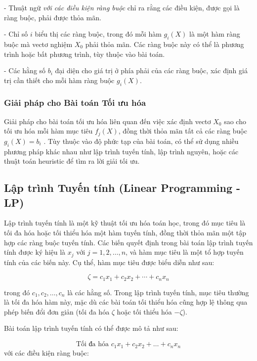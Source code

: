 - Thuật ngữ \textit{với các điều kiện ràng buộc} chỉ ra rằng các điều kiện, được gọi là ràng buộc, phải được thỏa mãn.

- Chỉ số \( i \) biểu thị các ràng buộc, trong đó mỗi hàm \( g_i(X) \) là một hàm ràng buộc mà vectơ nghiệm \( X_0 \) phải thỏa mãn. Các ràng buộc này có thể là phương trình hoặc bất phương trình, tùy thuộc vào bài toán.

- Các hằng số \( b_i \) đại diện cho giá trị ở phía phải của các ràng buộc, xác định giá trị cần thiết cho mỗi hàm ràng buộc \( g_i(X) \).

\subsubsection{Giải pháp cho Bài toán Tối ưu hóa}
\hspace{0.5cm}Giải pháp cho bài toán tối ưu hóa liên quan đến việc xác định vectơ \( X_0 \) sao cho tối ưu hóa mỗi hàm mục tiêu \( f_j(X) \), đồng thời thỏa mãn tất cả các ràng buộc \( g_i(X) = b_i \) \cite{GiordanoFoxHorton}. Tùy thuộc vào độ phức tạp của bài toán, có thể sử dụng nhiều phương pháp khác nhau như lập trình tuyến tính, lập trình nguyên, hoặc các thuật toán heuristic để tìm ra lời giải tối ưu.

\subsection{Lập trình Tuyến tính (Linear Programming - LP)}

\hspace{0.5cm}
Lập trình tuyến tính là một kỹ thuật tối ưu hóa toán học, trong đó mục tiêu là tối đa hóa hoặc tối thiểu hóa một hàm tuyến tính, đồng thời thỏa mãn một tập hợp các ràng buộc tuyến tính. Các biến quyết định trong bài toán lập trình tuyến tính được ký hiệu là \(x_j\) với \(j = 1, 2, \dots, n\), và hàm mục tiêu là một tổ hợp tuyến tính của các biến này. Cụ thể, hàm mục tiêu được biểu diễn như sau:

\[
\zeta = c_1 x_1 + c_2 x_2 + \cdots + c_n x_n
\]

trong đó \(c_1, c_2, \dots, c_n\) là các hằng số. Trong lập trình tuyến tính, mục tiêu thường là tối đa hóa hàm này, mặc dù các bài toán tối thiểu hóa cũng hợp lệ thông qua phép biến đổi đơn giản (tối đa hóa \(\zeta\) hoặc tối thiểu hóa \(-\zeta\)).

Bài toán lập trình tuyến tính có thể được mô tả như sau:

\begin{equation}
\text{Tối đa hóa } c_1 x_1 + c_2 x_2 + \dots + c_n x_n
\end{equation}
với các điều kiện ràng buộc:

